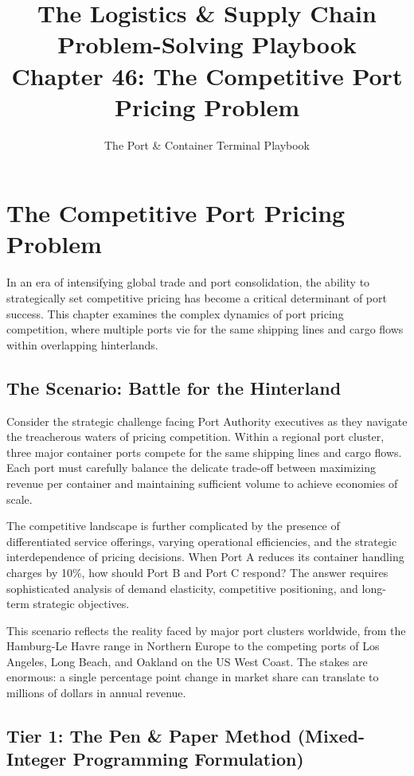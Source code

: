 \documentclass{article}
\title{The Logistics \& Supply Chain Problem-Solving Playbook\\
Chapter 46: The Competitive Port Pricing Problem}
\author{The Port \& Container Terminal Playbook}
\date{}
\begin{document}
\maketitle

\section{The Competitive Port Pricing Problem}

In an era of intensifying global trade and port consolidation, the ability to strategically set competitive pricing has become a critical determinant of port success. This chapter examines the complex dynamics of port pricing competition, where multiple ports vie for the same shipping lines and cargo flows within overlapping hinterlands.

\subsection{The Scenario: Battle for the Hinterland}

Consider the strategic challenge facing Port Authority executives as they navigate the treacherous waters of pricing competition. Within a regional port cluster, three major container ports compete for the same shipping lines and cargo flows. Each port must carefully balance the delicate trade-off between maximizing revenue per container and maintaining sufficient volume to achieve economies of scale.

The competitive landscape is further complicated by the presence of differentiated service offerings, varying operational efficiencies, and the strategic interdependence of pricing decisions. When Port A reduces its container handling charges by 10\%, how should Port B and Port C respond? The answer requires sophisticated analysis of demand elasticity, competitive positioning, and long-term strategic objectives.

This scenario reflects the reality faced by major port clusters worldwide, from the Hamburg-Le Havre range in Northern Europe to the competing ports of Los Angeles, Long Beach, and Oakland on the US West Coast. The stakes are enormous: a single percentage point change in market share can translate to millions of dollars in annual revenue.

\subsection{Tier 1: The Pen \& Paper Method (Mixed-Integer Programming Formulation)}
\end{document}
